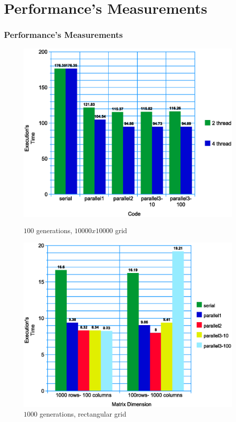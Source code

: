 \documentclass{beamer}
\begin{document}
\section{Performance's Measurements}
\begin{frame}
	\frametitle{Performance's Measurements}
	\begin{figure}
		\centering
		\begin{minipage}{0.5\textwidth}
			\centering
			\includegraphics[width=\linewidth]{../report/10000-100.eps}
			\caption{$100$ generations, $10000x10000$ grid}
		\end{minipage}%
		\begin{minipage}{0.5\textwidth}
			\centering
			\includegraphics[width=\linewidth]{../report/matdim.eps}
			\caption{$1000$ generations, rectangular grid}
		\end{minipage}
	\end{figure}
\end{frame}
\end{document}
